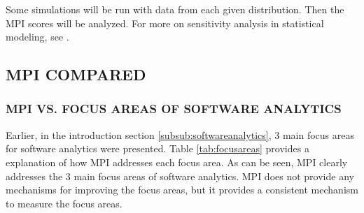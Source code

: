 \documentclass[SDSUThesis.tex]{subfiles}
\begin{document}
        Some simulations will be run with data from each given distribution.  Then the MPI scores
        will be analyzed.
        For more on sensitivity analysis in statistical modeling, see \cite{Saltelli2000}.

    \subsection{MPI COMPARED}
    
        \subsubsection{MPI VS. FOCUS AREAS OF SOFTWARE ANALYTICS}
    
            Earlier, in the introduction section \ref{subsub:softwareanalytics}, 3 main focus 
            areas  for software
            analytics were presented.  Table \ref{tab:focusareas} provides a explanation of how MPI addresses
            each focus area.  
            As can be seen, MPI clearly addresses the 3 main focus areas of software analytics.  MPI does not provide
            any mechanisms for improving the focus areas, but it provides a consistent mechanism to measure
            the focus areas. 
            
\end{document}
